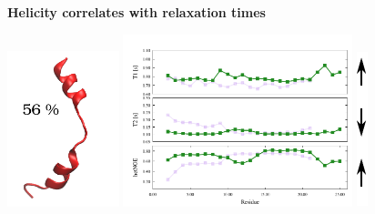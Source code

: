 \addtocounter{framenumber}{-1}
\begin{frame}
\LARGE{\centering
\textbf{Helicity correlates with relaxation times} \\}
\begin{center}
 \includegraphics[height=4.5cm]{plots/helix2.pdf}
 \includegraphics[height=5cm]{plots/simul_helix12.pdf}
 \includegraphics[height=4.5cm]{plots/arrows.pdf}
\end{center}
\end{frame}



